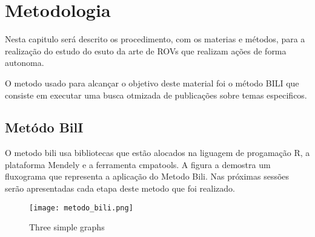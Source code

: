 \chapter{Metodologia}
\label{chap:metod}
Nesta capitulo será descrito os procedimento, com os materias e métodos, para a realização do estudo do esuto da arte de ROVs que realizam ações de forma autonoma.

O metodo usado para alcançar o objetivo deste material foi o método BILI que consiste em executar uma busca otmizada de publicações sobre temas especificos.

\section{Metódo BilI}

O metodo bili usa bibliotecas que estão alocados na liguagem de progamação R,  a plataforma Mendely e a ferramenta cmpatools. A figura a demostra um fluxograma que representa a aplicação do Metodo Bili.  Nas próximas sessões serão apresentadas  cada etapa deste metodo que foi realizado.

\begin{figure}
    \centering
   
    \texttt{[image: metodo\_bili.png]}
    \caption{Three simple graphs}
    \label{fig:three graphs}
\end{figure}
